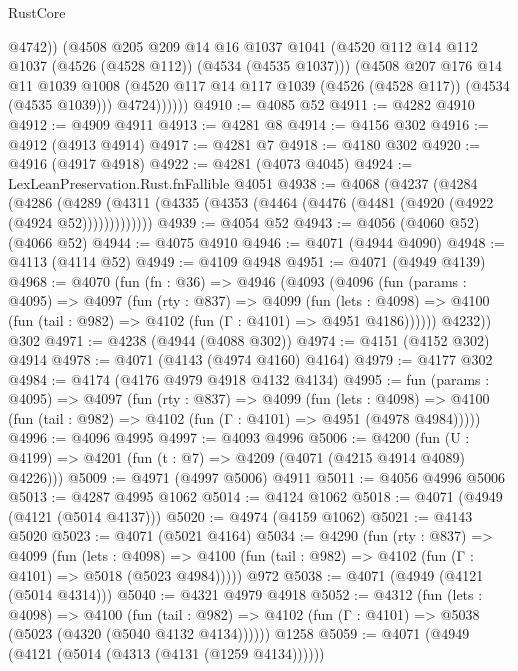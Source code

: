\begin{lexlean}{RustCore}
\begin{coremodule}
                @4742))
            (@4508
              @205
              @209
              @14
              @16
              @1037
              @1041
              (@4520 @112 @14 @112 @1037 (@4526 (@4528 @112)) (@4534 (@4535 @1037)))
              (@4508
                @207
                @176
                @14
                @11
                @1039
                @1008
                (@4520 @117 @14 @117 @1039 (@4526 (@4528 @117)) (@4534 (@4535 @1039)))
                @4724))))))
@4910 := @4085 @52
@4911 := @4282 @4910
@4912 := @4909 @4911
@4913 := @4281 @8
@4914 := @4156 @302
@4916 := @4912 (@4913 @4914)
@4917 := @4281 @7
@4918 := @4180 @302
@4920 := @4916 (@4917 @4918)
@4922 := @4281 (@4073 @4045)
@4924 := LexLeanPreservation.Rust.fnFallible @4051
@4938 := @4068
    (@4237
      (@4284
        (@4286
          (@4289 (@4311 (@4335 (@4353 (@4464 (@4476 (@4481 (@4920 (@4922 (@4924 @52)))))))))))))
@4939 := @4054 @52
@4943 := @4056 (@4060 @52) (@4066 @52)
@4944 := @4075 @4910
@4946 := @4071 (@4944 @4090)
@4948 := @4113 (@4114 @52)
@4949 := @4109 @4948
@4951 := @4071 (@4949 @4139)
@4968 := @4070
    (fun (fn : @36) =>
    @4946
      (@4093
        (@4096
          (fun (params : @4095) =>
          @4097
            (fun (rty : @837) =>
            @4099
              (fun (lets : @4098) =>
              @4100 (fun (tail : @982) => @4102 (fun (Γ : @4101) => @4951 @4186))))))
        @4232))
    @302
@4971 := @4238 (@4944 (@4088 @302))
@4974 := @4151 (@4152 @302) @4914
@4978 := @4071 (@4143 (@4974 @4160) @4164)
@4979 := @4177 @302
@4984 := @4174 (@4176 @4979 @4918 @4132 @4134)
@4995 := fun (params : @4095) =>
  @4097
    (fun (rty : @837) =>
    @4099
      (fun (lets : @4098) =>
      @4100 (fun (tail : @982) => @4102 (fun (Γ : @4101) => @4951 (@4978 @4984)))))
@4996 := @4096 @4995
@4997 := @4093 @4996
@5006 := @4200 (fun (U : @4199) => @4201 (fun (t : @7) => @4209 (@4071 (@4215 @4914 @4089) @4226)))
@5009 := @4971 (@4997 @5006) @4911
@5011 := @4056 @4996 @5006
@5013 := @4287 @4995 @1062
@5014 := @4124 @1062
@5018 := @4071 (@4949 (@4121 (@5014 @4137)))
@5020 := @4974 (@4159 @1062)
@5021 := @4143 @5020
@5023 := @4071 (@5021 @4164)
@5034 := @4290
    (fun (rty : @837) =>
    @4099
      (fun (lets : @4098) =>
      @4100 (fun (tail : @982) => @4102 (fun (Γ : @4101) => @5018 (@5023 @4984)))))
    @972
@5038 := @4071 (@4949 (@4121 (@5014 @4314)))
@5040 := @4321 @4979 @4918
@5052 := @4312
    (fun (lets : @4098) =>
    @4100
      (fun (tail : @982) => @4102 (fun (Γ : @4101) => @5038 (@5023 (@4320 (@5040 @4132 @4134))))))
    @1258
@5059 := @4071 (@4949 (@4121 (@5014 (@4313 (@4131 (@1259 @4134))))))

\end{coremodule}
\end{lexlean}
